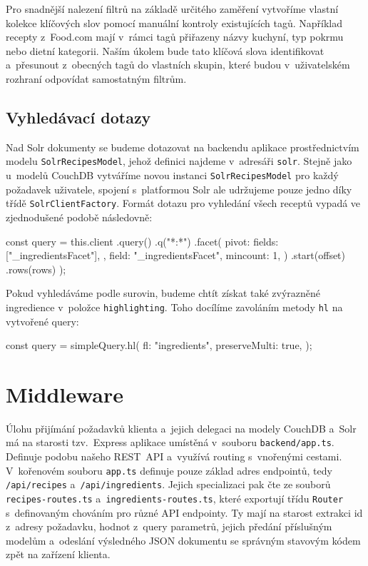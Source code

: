 Pro snadnější nalezení filtrů na základě určitého zaměření vytvoříme vlastní kolekce klíčových slov pomocí manuální kontroly existujících tagů. Například recepty z~Food.com mají v~rámci tagů přiřazeny názvy kuchyní, typ pokrmu nebo dietní kategorii. Naším úkolem bude tato klíčová slova identifikovat a~přesunout z~obecných tagů do vlastních skupin, které budou v~uživatelském rozhraní odpovídat samostatným filtrům.

\subsection{Vyhledávací dotazy}

Nad Solr dokumenty se budeme dotazovat na backendu aplikace prostřednictvím modelu \texttt{SolrRecipesModel}, jehož definici najdeme v~adresáři \texttt{solr}. Stejně jako u~modelů CouchDB vytváříme novou instanci \texttt{SolrRecipesModel} pro každý požadavek uživatele, spojení s~platformou Solr ale udržujeme pouze jedno díky třídě \texttt{SolrClientFactory}. Formát dotazu pro vyhledání všech receptů vypadá ve zjednodušené podobě následovně:
\begingroup
\samepage
\begin{code}
const query = this.client
  .query()
  .q("*:*")
  .facet({
    pivot: {
      fields: ["_ingredientsFacet"],
    },
    field: "_ingredientsFacet",
    mincount: 1,
  })
  .start(offset)
  .rows(rows)
);
\end{code}
\endgroup

Pokud vyhledáváme podle surovin, budeme chtít získat také zvýrazněné ingredience v~položce \texttt{highlighting}. Toho docílíme zavoláním metody \texttt{hl} na vytvořené query:
\begingroup
\samepage
\begin{code}
const query = simpleQuery.hl({
  fl: "ingredients",
  preserveMulti: true,
});
\end{code}
\endgroup

\section{Middleware}

Úlohu přijímání požadavků klienta a~jejich delegaci na modely CouchDB a~Solr má na starosti tzv.~Express aplikace umístěná v~souboru \texttt{backend/app.ts}. Definuje podobu našeho REST~API a~využívá routing s~vnořenými cestami. V~kořenovém souboru \texttt{app.ts} definuje pouze základ adres endpointů, tedy \texttt{/api/recipes} a~\texttt{/api/ingredients}. Jejich specializaci pak čte ze souborů \texttt{recipes-routes.ts} a~\texttt{ingredients-routes.ts}, které exportují třídu \texttt{Router} s~definovaným chováním pro různé API endpointy. Ty mají na starost extrakci id z~adresy požadavku, hodnot z~query parametrů, jejich předání příslušným modelům a~odeslání výsledného JSON dokumentu se správným stavovým kódem zpět na zařízení klienta.

